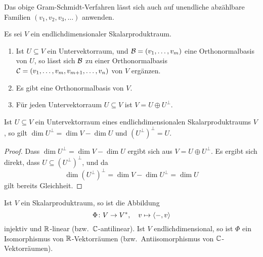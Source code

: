 \begin{remark}
  Das obige Gram-Schmidt-Verfahren lässt sich auch auf unendliche abzählbare Familien $(v_1, v_2, v_3, \dotsc)$ anwenden.
\end{remark}


\begin{corollary}
  Es sei $V$ ein endlichdimensionaler Skalarproduktraum.
  \begin{enumerate}[leftmargin=*]
    \item
      Ist $U \subseteq V$ ein Untervektorraum, und $\mathcal{B} = (v_1, \dotsc, v_m)$ eine Orthonormalbasis von $U$, so lässt sich $\mathcal{B}$ zu einer Orthonormalbasis $\mathcal{C} = (v_1, \dotsc, v_m, v_{m+1}, \dotsc, v_n)$ von $V$ ergänzen.
    \item
      Es gibt eine Orthonormalbasis von $V$.
    \item
      Für jeden Untervektorraum $U \subseteq V$ ist $V = U \oplus U^\perp$.
  \end{enumerate}
\end{corollary}


\begin{corollary}
  Ist $U \subseteq V$ ein Untervektorraum eines endlichdimensionalen Skalarproduktraums $V$, so gilt $\dim U^\perp = \dim V - \dim U$ und $(U^\perp)^\perp = U$.
\end{corollary}


\begin{proof}
  Dass $\dim U^\perp = \dim V - \dim U$ ergibt sich aus $V = U \oplus U^\perp$.
  Es ergibt sich direkt, dass $U \subseteq (U^\perp)^\perp$, und da
  \[
      \dim (U^\perp)^\perp
    = \dim V - \dim U^\perp
    = \dim U
  \]
  gilt bereits Gleichheit.
\end{proof}


\begin{proposition}
  Ist $V$ ein Skalarproduktraum, so ist die Abbildung
  \[
    \Phi \colon V \to V^*,
    \quad
    v \mapsto \left\langle -, v \right\rangle
  \]
  injektiv und $\mathbb{R}$-linear (bzw.\ $\mathbb{C}$-antilinear).
  Ist $V$ endlichdimensional, so ist $\Phi$ ein Isomorphismus von $\mathbb{R}$-Vektorräumen (bzw.\ Antiisomorphismus von $\mathbb{C}$-Vektorräumen).
\end{proposition}
















